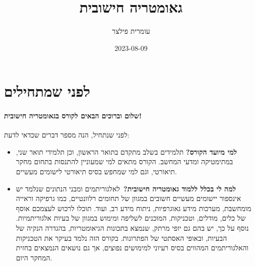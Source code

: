 \documentclass[
]{book}
\title{גאומטריה חישובית}
\author{עומרית פילצר}
\date{2023-08-09}
\theoremstyle{definition}
\theoremstyle{definition}
\theoremstyle{definition}
\theoremstyle{definition}
\theoremstyle{remark}
\begin{document}
\maketitle

{
\setcounter{tocdepth}{1}
\tableofcontents
}
\hypertarget{ux5dcux5e4ux5e0ux5d9-ux5e9ux5deux5eaux5d7ux5d9ux5dcux5d9ux5dd}{%
\chapter*{\texorpdfstring{\textbf{לפני שמתחילים}}{לפני שמתחילים}}\label{ux5dcux5e4ux5e0ux5d9-ux5e9ux5deux5eaux5d7ux5d9ux5dcux5d9ux5dd}}

\hypertarget{ux5e9ux5dcux5d5ux5dd-ux5d5ux5d1ux5e8ux5d5ux5dbux5d9ux5dd-ux5d4ux5d1ux5d0ux5d9ux5dd-ux5dcux5e7ux5d5ux5e8ux5e1-ux5d1ux5d2ux5d0ux5d5ux5deux5d8ux5e8ux5d9ux5d4-ux5d7ux5d9ux5e9ux5d5ux5d1ux5d9ux5ea}{%
\subsubsection*{\texorpdfstring{\textbf{שלום וברוכים הבאים לקורס בגאומטריה חישובית!}}{שלום וברוכים הבאים לקורס בגאומטריה חישובית!}}\label{ux5e9ux5dcux5d5ux5dd-ux5d5ux5d1ux5e8ux5d5ux5dbux5d9ux5dd-ux5d4ux5d1ux5d0ux5d9ux5dd-ux5dcux5e7ux5d5ux5e8ux5e1-ux5d1ux5d2ux5d0ux5d5ux5deux5d8ux5e8ux5d9ux5d4-ux5d7ux5d9ux5e9ux5d5ux5d1ux5d9ux5ea}}

לפני שנתחיל, הנה מספר דברים שכדאי לדעת:

\begin{itemize}
\item
  \textbf{למי מיועד הקורס?} תלמידים בשלב מתקדם בתואר הראשון, וכן תלמידי תואר שני, במתימטיקה ומדעי המחשב. הקורס מתאים למי שמעוניין להתנסות בתחום מחקר תיאורטי, וגם למי שמחפש בסיס תיאורטי לישומים מעשיים.
\item
  \textbf{למה לי בכלל ללמוד גאומטריה חישובית?}~לאלגוריתמים ומבני הנתונים שנלמד יש אינספור יישומים מעשיים חשובים במגוון של תחומים רלוונטיים, כמו גרפיקה וראייה מומחשבת, מערכות מידע גאוגרפיות, ניתוח מידע רב, ועוד. תוכלו לרכוש לעצמכם אוסף של כלים, מודלים, וטכניקות, המוכנים לשליפה ומימוש במגוון של בעיות אלגוריתמיות. נוסף על כך, יש בהם גם יופי מרתק, שנמצא בתכונות הגיאומטריות, בהגדרה הנקיה של הבעיות, ובאופי האסתטי של הפתרונות. בקורס הזה נלמד בעיקר את הטכניקות והאלגוריתמים המהווים בסיס רעיוני למימושים נפוצים, אך גם נושאים הנמצאים בחזית המחקר היום.
\end{itemize}
\end{document}
